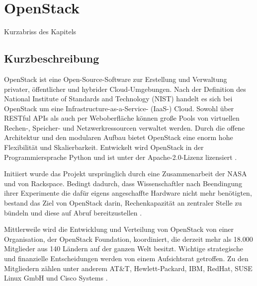 \chapter{OpenStack}

Kurzabriss des Kapitels

\section{Kurzbeschreibung}OpenStack ist eine Open-Source-Software zur Erstellung und Verwaltung privater, öffentlicher und hybrider Cloud-Umgebungen. Nach der Definition des National Institute of Standards and Technology (NIST) handelt es sich bei OpenStack um eine Infrastructure-as-a-Service- (IaaS-) Cloud. Sowohl über RESTful APIs als auch per Weboberfläche können große Pools von virtuellen Rechen-, Speicher- und Netzwerkressourcen verwaltet werden. Durch die offene Architektur und den modularen Aufbau bietet OpenStack eine enorm hohe Flexibilität und Skalierbarkeit. Entwickelt wird OpenStack in der Programmiersprache Python und ist unter der Apache-2.0-Lizenz lizensiert \cite[vgl.][S. 7ff]{Beitter}. 

Initiiert wurde das Projekt ursprünglich durch eine Zusammenarbeit der NASA und von Rackspace. Bedingt dadurch, dass Wissenschaftler nach Beendingung ihrer Experimente die dafür eigens angeschaffte Hardware nicht mehr benötigten, bestand das Ziel von OpenStack darin, Rechenkapazität an zentraler Stelle zu bündeln und diese auf Abruf bereitzustellen \cite[vgl.][]{Loschwitz}.

Mittlerweile wird die Entwicklung und Verteilung von OpenStack von einer Organisation, der OpenStack Foundation, koordiniert, die derzeit mehr als 18.000 Mitglieder aus 140 Ländern auf der ganzen Welt besitzt. Wichtige strategische und finanzielle Entscheidungen werden von einem Aufsichtsrat getroffen. Zu den Mitgliedern zählen unter anderem AT\&T, Hewlett-Packard, IBM, RedHat, SUSE Linux GmbH und Cisco Systems \cite[vgl.][]{OpenStackFoundation}.

